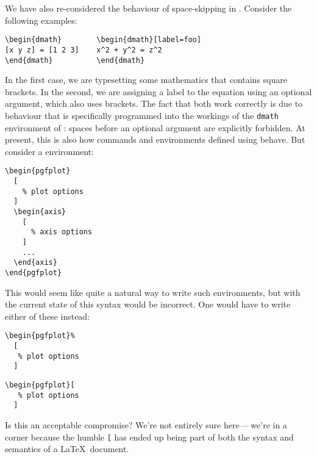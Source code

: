 \documentclass{ltnews}
\def\Dash{\,---\,}
\begin{document}
We have also re-considered the behaviour of space-skipping in .
Consider the following examples:
\begin{verbatim}
\begin{dmath}        \begin{dmath}[label=foo]
[x y z] = [1 2 3]    x^2 + y^2 = z^2
\end{dmath}          \end{dmath}
\end{verbatim}
In the first case, we are typesetting some mathematics that contains square brackets.
In the second, we are assigning a label to the equation using an optional argument, which also uses  brackets.
The fact that both work correctly is due to behaviour that is specifically programmed into the workings of the \texttt{dmath} environment of : spaces before an optional argument are explicitly forbidden.
At present, this is also how commands and environments defined using  behave.
But consider a  environment:
\begin{verbatim}
\begin{pgfplot}
  [
    % plot options
  ]
  \begin{axis}
    [
      % axis options
    ]
    ...
  \end{axis}
\end{pgfplot}
\end{verbatim}
This would seem like quite a natural way to write such environments, but with the current state of  this syntax would be incorrect. One would have to write either of these instead:
\begin{multicols}{2}
\begin{verbatim}
\begin{pgfplot}%
  [
   % plot options
  ]
\end{verbatim}
\begin{verbatim}
\begin{pgfplot}[
   % plot options
  ]
\end{verbatim}
\end{multicols}
Is this an acceptable compromise?
We're not entirely sure here\Dash we're in a corner because the humble \texttt{[} has ended up being part of both the syntax and semantics of a \LaTeX\ document.

\end{document}
